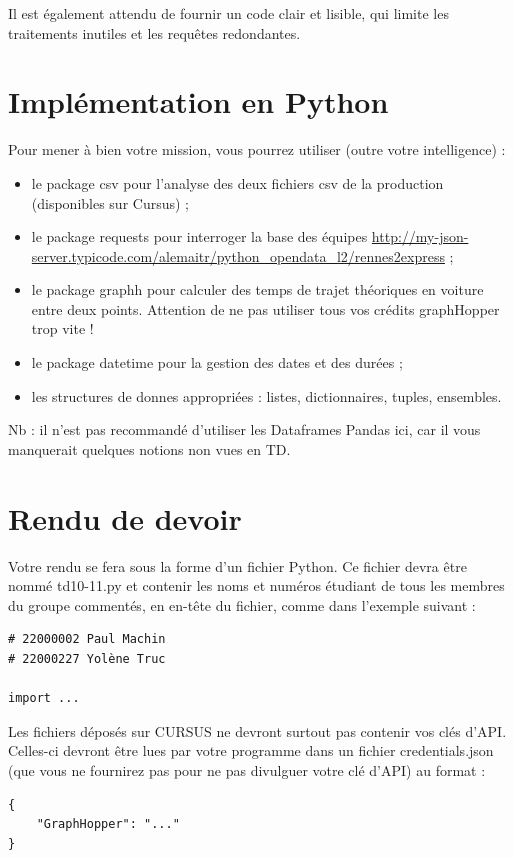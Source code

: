 \documentclass[11pt,a4paper]{article}
\begin{document}
Il est également attendu de fournir un code clair et lisible, qui limite les traitements inutiles et les requêtes redondantes.

\section{Implémentation en Python}

Pour mener à bien votre mission, vous pourrez utiliser (outre votre intelligence) :
\begin{itemize}
\item le package csv pour l'analyse des deux fichiers csv de la production (disponibles sur Cursus) ;
\item le package requests pour interroger la base des équipes \url{http://my-json-server.typicode.com/alemaitr/python_opendata_l2/rennes2express} ;
\item le package graphh pour calculer des temps de trajet théoriques en voiture entre deux points. Attention de ne pas utiliser tous vos crédits graphHopper trop vite !
\item le package datetime pour la gestion des dates et des durées ;
\item les structures de donnes appropriées : listes, dictionnaires, tuples, ensembles.
\end{itemize}

Nb : il n'est pas recommandé d'utiliser les Dataframes Pandas ici, car il vous manquerait quelques notions non vues en TD. 

\section{Rendu de devoir}
Votre rendu se fera sous la forme d’un
fichier Python. Ce fichier devra être nommé td10-11.py et contenir les noms et numéros étudiant de tous
les membres du groupe commentés, en en-tête du fichier, comme dans l’exemple suivant :
\begin{verbatim}
# 22000002 Paul Machin
# 22000227 Yolène Truc

import ...
\end{verbatim}
Les fichiers déposés sur CURSUS ne devront surtout pas contenir vos clés d’API. Celles-ci devront être lues par votre programme dans un fichier credentials.json (que vous ne fournirez pas pour ne pas divulguer votre clé d’API) au format :
\begin{verbatim}
{
    "GraphHopper": "..."
}
\end{verbatim}
\end{document}

